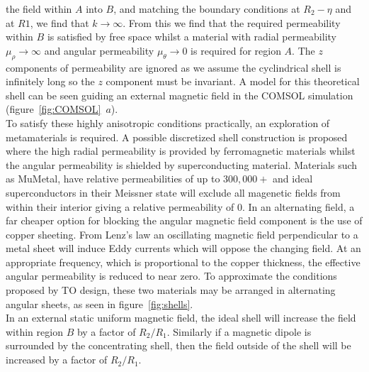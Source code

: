 \documentclass[11pt]{iopart}
\begin{document}
the field within $A$ into $B$, and matching the boundary conditions at
$R_2-\eta$ and at $R1$, we find that $k \rightarrow \infty$. From this
we find that the required permeability within $B$ is satisfied by free
space whilst a material with radial permeability $\mu_\rho \rightarrow
\infty$ and angular permeability $\mu_\theta \rightarrow 0$ is
required for region $A$. The $z$ components of permeability are ignored
as we assume the cyclindrical shell is
infinitely long so the $z$ component must be invariant. A model for
this theoretical shell can be seen guiding an external magnetic field
in the COMSOL simulation (figure~\ref{fig:COMSOL}~$a$).\\ To satisfy
these highly anisotropic conditions practically, an exploration of
metamaterials is required. A possible discretized shell construction
is proposed~\cite{N2014} where the high radial permeability is
provided by ferromagnetic materials whilst the angular permeability is
shielded by superconducting material. Materials such as MuMetal, have
relative permeabilities of up to $300,000+$ and ideal
superconductors in their Meissner state will exclude all magenetic
fields from within their interior giving a relative permeability of
$0$. In an alternating field, a far cheaper option for
blocking the angular magnetic field component is the use of copper
sheeting. From Lenz's law an oscillating magnetic field perpendicular
to a metal sheet will induce Eddy currents which will oppose the
changing field. At an appropriate frequency, which is proportional to
the copper thickness, the effective angular permeability is reduced to
near zero. To approximate the conditions proposed by TO design, these
two materials may be arranged in alternating angular sheets, as seen
in figure~\ref{fig:shells}. \\ In an external static uniform magnetic
field, the ideal shell will increase the field within region $B$ by a
factor of $R_2/R_1$. Similarly if a magnetic dipole is surrounded by
the concentrating shell, then the field outside of the shell will be
increased by a factor of $R_2/R_1$. \\
\end{document}
